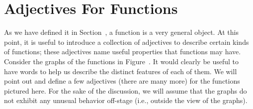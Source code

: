 \section{Adjectives For Functions}{}{}
\label{sec:adjectives for functions}

As we have defined it in Section~, a function is
a very general object.  At this point, it is useful to introduce a
collection of adjectives to describe certain kinds of functions; these
adjectives name useful properties that functions may have.  Consider
the graphs of the functions in Figure~.  It
would clearly be useful to have words to help us describe the distinct
features of each of them.  We will point out and define a few
adjectives (there are many more) for the functions pictured here.  For
the sake of the discussion, we will assume that the graphs do not
exhibit any unusual behavior off-stage (i.e., outside the view of the
graphs).

